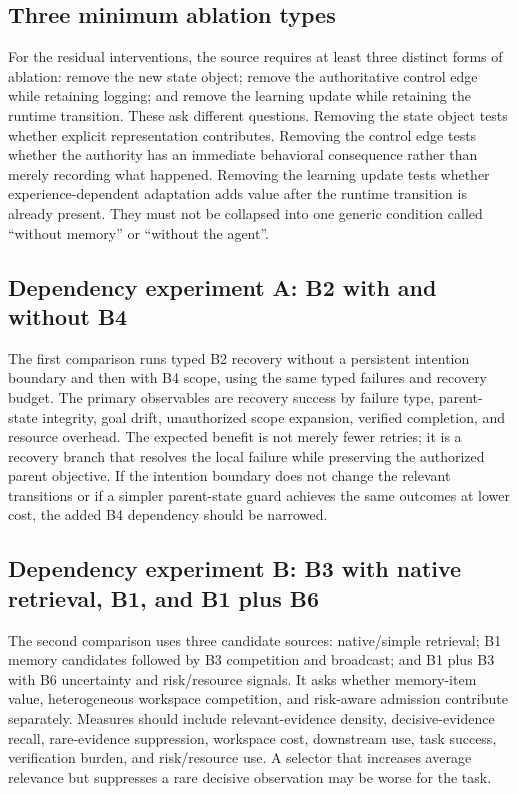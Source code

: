 \subsection{Three minimum ablation types}
\label{subsec:ch18-three-ablation-types}

For the residual interventions, the source requires at least three distinct forms of ablation: remove the new state object; remove the authoritative control edge while retaining logging; and remove the learning update while retaining the runtime transition. These ask different questions. Removing the state object tests whether explicit representation contributes. Removing the control edge tests whether the authority has an immediate behavioral consequence rather than merely recording what happened. Removing the learning update tests whether experience-dependent adaptation adds value after the runtime transition is already present. They must not be collapsed into one generic condition called \enquote{without memory} or \enquote{without the agent}.

\subsection{Dependency experiment A: B2 with and without B4}
\label{subsec:ch18-ablation-b2-b4}

The first comparison runs typed B2 recovery without a persistent intention boundary and then with B4 scope, using the same typed failures and recovery budget. The primary observables are recovery success by failure type, parent-state integrity, goal drift, unauthorized scope expansion, verified completion, and resource overhead. The expected benefit is not merely fewer retries; it is a recovery branch that resolves the local failure while preserving the authorized parent objective. If the intention boundary does not change the relevant transitions or if a simpler parent-state guard achieves the same outcomes at lower cost, the added B4 dependency should be narrowed.

\subsection{Dependency experiment B: B3 with native retrieval, B1, and B1 plus B6}
\label{subsec:ch18-ablation-b1-b3-b6}

The second comparison uses three candidate sources: native/simple retrieval; B1 memory candidates followed by B3 competition and broadcast; and B1 plus B3 with B6 uncertainty and risk/resource signals. It asks whether memory-item value, heterogeneous workspace competition, and risk-aware admission contribute separately. Measures should include relevant-evidence density, decisive-evidence recall, rare-evidence suppression, workspace cost, downstream use, task success, verification burden, and risk/resource use. A selector that increases average relevance but suppresses a rare decisive observation may be worse for the task.

